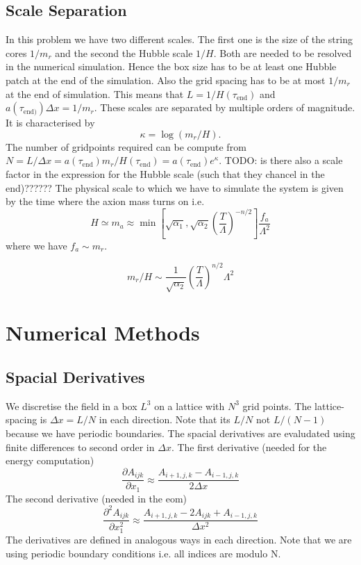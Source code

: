 \documentclass[a4paper]{article}
\begin{document}
\subsection{Scale Separation}
In this problem we have two different scales. 
The first one is the size of the string cores $1/m_r$ and the second the Hubble scale $1/H$.
Both are needed to be resolved in the numerical simulation.
Hence the box size has to be at least one Hubble patch at the end of the simulation.
Also the grid spacing has to be at most $1/m_r$ at the end of simulation.
This means that $L = 1 / H(\tau_\mathrm{end})$ and $a(\tau_\mathrm{end)}) \Delta x = 1/m_r$.
These scales are separated by multiple orders of magnitude. It is characterised by 
\begin{equation}
	\kappa = \log(m_r / H).
\end{equation} 
The number of gridpoints required can be compute from $N = L / \Delta x = a(\tau_\mathrm{end}) m_r / H(\tau_\mathrm{end}) = a(\tau_\mathrm{end})e^{\kappa}$.
TODO: is there also a scale factor in the expression for the Hubble scale (such that they chancel in the end)??????
The physical scale to which we have to simulate the system is given by the time where the axion mass turns on i.e.
\begin{equation}
	H \simeq m_a \approx \min \left[ \sqrt{\alpha_1}, \sqrt{\alpha_2} \left( \frac{T}{\Lambda} \right)^{-n/2} \right] \frac{f_a}{\Lambda^2}
\end{equation}
where we have $f_a \sim m_r$.



\begin{equation}
	m_r / H \sim \frac{1}{\sqrt{\alpha_2}} \left( \frac{T}{\Lambda} \right)^{n/2} \Lambda^2
\end{equation}

\section{Numerical Methods}

\subsection{Spacial Derivatives}
We discretise the field in a box $L^3$ on a lattice with $N^3$ grid points. 
The lattice-spacing is $\Delta x = L / N$ in each direction. 
Note that its $L / N$ not $L / (N - 1)$ because we have periodic boundaries.
The spacial derivatives are evaludated using finite differences to second order in $\Delta x$.
The first derivative (needed for the energy computation)
\begin{equation}
	\frac{\partial A_{ijk}}{\partial x_1} \approx \frac{A_{i + 1,j,k} - A_{i - 1,j,k}}{2\Delta x}
\end{equation}
The second derivative (needed in the eom)
\begin{equation}
	\frac{\partial^2 A_{ijk}}{\partial x_1^2} \approx \frac{A_{i + 1,j,k} - 2 A_{ijk} + A_{i - 1,j,k}}{\Delta x^2}
\end{equation}
The derivatives are defined in analogous ways in each direction.
Note that we are using periodic boundary conditions i.e.  all indices are modulo N.
\end{document}
